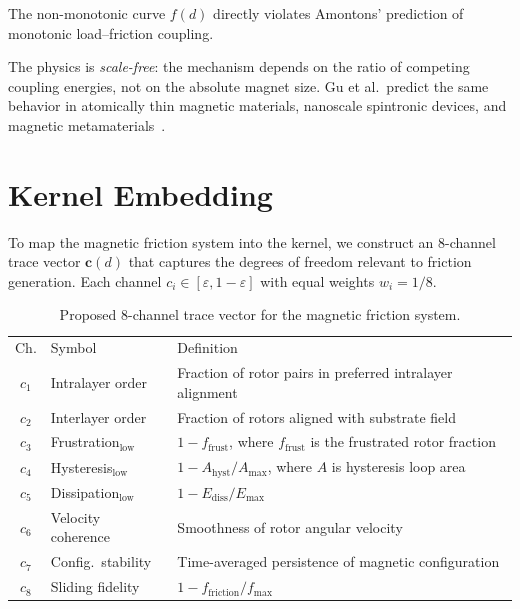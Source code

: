 \documentclass[
  aps,
  prd,
  twocolumn,
  superscriptaddress,
  nofootinbib,
  floatfix
]{revtex4-2}
\newcommand{\eps}{\varepsilon}
\newcommand{\tvec}{\mathbf{c}}
\begin{document}
\noindent The non-monotonic curve $f(d)$ directly violates
Amontons' prediction of monotonic load--friction coupling.

The physics is \emph{scale-free}: the mechanism depends on
the ratio of competing coupling energies, not on the
absolute magnet size.  Gu et al.\ predict the same behavior
in atomically thin magnetic materials, nanoscale spintronic
devices, and magnetic metamaterials~\cite{gu2026magnetic}.

\section{Kernel Embedding}\label{sec:embedding}

To map the magnetic friction system into the kernel, we
construct an 8-channel trace vector $\tvec(d)$ that
captures the degrees of freedom relevant to friction
generation.  Each channel $c_i \in [\eps, 1{-}\eps]$
with equal weights $w_i = 1/8$.

\begin{table}[tb]
\caption{\label{tab:channels}
  Proposed 8-channel trace vector for the
  magnetic friction system.}
\begin{ruledtabular}
\begin{tabular}{clp{3.6cm}}
  \textrm{Ch.} & \textrm{Symbol} & \textrm{Definition} \\
  \colrule
  $c_1$ & Intralayer order & Fraction of rotor pairs in preferred
    intralayer alignment \\
  $c_2$ & Interlayer order & Fraction of rotors aligned with
    substrate field \\
  $c_3$ & Frustration$_{\mathrm{low}}$ &
    $1 - f_{\mathrm{frust}}$, where $f_{\mathrm{frust}}$
    is the frustrated rotor fraction \\
  $c_4$ & Hysteresis$_{\mathrm{low}}$ &
    $1 - A_{\mathrm{hyst}} / A_{\mathrm{max}}$,
    where $A$ is hysteresis loop area \\
  $c_5$ & Dissipation$_{\mathrm{low}}$ &
    $1 - E_{\mathrm{diss}} / E_{\mathrm{max}}$ \\
  $c_6$ & Velocity coherence &
    Smoothness of rotor angular velocity \\
  $c_7$ & Config.\ stability &
    Time-averaged persistence of magnetic
    configuration \\
  $c_8$ & Sliding fidelity &
    $1 - f_{\mathrm{friction}} / f_{\mathrm{max}}$ \\
\end{tabular}
\end{ruledtabular}
\end{table}
\end{document}
